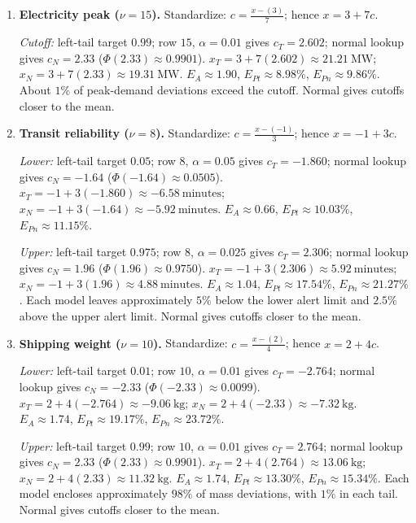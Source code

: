 \begin{enumerate}[leftmargin=*,label=\textbf{\arabic*.},itemsep=5pt,parsep=1pt,topsep=3pt]
		\item \textbf{Electricity peak ($\nu=15$).} Standardize: $c=\frac{x-(3)}{7}$; hence $x=3+7c$.\par\textit{Cutoff:} left-tail target $0.99$; row $15$, $\alpha=0.01$ gives $c_T=2.602$; normal lookup gives $c_N=2.33$ ($\Phi(2.33)\approx0.9901$). $x_T=3+7(2.602)\approx\boxed{21.21\ \text{MW}}$; $x_N=3+7(2.33)\approx\boxed{19.31\ \text{MW}}$. $E_A\approx1.90$, $E_{Pt}\approx8.98\%$, $E_{Pn}\approx9.86\%$. About $1\%$ of peak-demand deviations exceed the cutoff. Normal gives cutoffs closer to the mean.
		\item \textbf{Transit reliability ($\nu=8$).} Standardize: $c=\frac{x-(-1)}{3}$; hence $x=-1+3c$.\par\textit{Lower:} left-tail target $0.05$; row $8$, $\alpha=0.05$ gives $c_T=-1.860$; normal lookup gives $c_N=-1.64$ ($\Phi(-1.64)\approx0.0505$). $x_T=-1+3(-1.860)\approx\boxed{-6.58\ \text{minutes}}$; $x_N=-1+3(-1.64)\approx\boxed{-5.92\ \text{minutes}}$. $E_A\approx0.66$, $E_{Pt}\approx10.03\%$, $E_{Pn}\approx11.15\%$.\par\textit{Upper:} left-tail target $0.975$; row $8$, $\alpha=0.025$ gives $c_T=2.306$; normal lookup gives $c_N=1.96$ ($\Phi(1.96)\approx0.9750$). $x_T=-1+3(2.306)\approx\boxed{5.92\ \text{minutes}}$; $x_N=-1+3(1.96)\approx\boxed{4.88\ \text{minutes}}$. $E_A\approx1.04$, $E_{Pt}\approx17.54\%$, $E_{Pn}\approx21.27\%$. Each model leaves approximately $5\%$ below the lower alert limit and $2.5\%$ above the upper alert limit. Normal gives cutoffs closer to the mean.
		\item \textbf{Shipping weight ($\nu=10$).} Standardize: $c=\frac{x-(2)}{4}$; hence $x=2+4c$.\par\textit{Lower:} left-tail target $0.01$; row $10$, $\alpha=0.01$ gives $c_T=-2.764$; normal lookup gives $c_N=-2.33$ ($\Phi(-2.33)\approx0.0099$). $x_T=2+4(-2.764)\approx\boxed{-9.06\ \text{kg}}$; $x_N=2+4(-2.33)\approx\boxed{-7.32\ \text{kg}}$. $E_A\approx1.74$, $E_{Pt}\approx19.17\%$, $E_{Pn}\approx23.72\%$.\par\textit{Upper:} left-tail target $0.99$; row $10$, $\alpha=0.01$ gives $c_T=2.764$; normal lookup gives $c_N=2.33$ ($\Phi(2.33)\approx0.9901$). $x_T=2+4(2.764)\approx\boxed{13.06\ \text{kg}}$; $x_N=2+4(2.33)\approx\boxed{11.32\ \text{kg}}$. $E_A\approx1.74$, $E_{Pt}\approx13.30\%$, $E_{Pn}\approx15.34\%$. Each model encloses approximately $98\%$ of mass deviations, with $1\%$ in each tail. Normal gives cutoffs closer to the mean.
	\end{enumerate}

